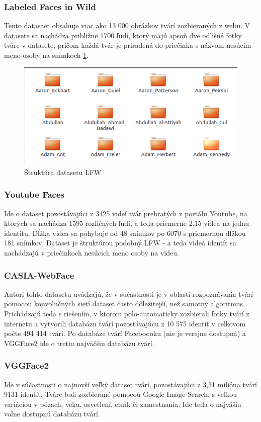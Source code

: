 \subsubsection{Labeled Faces in Wild}
Tento datasaet obsahuje viac ako 13 000 obrázkov tvárí zozbieraných z webu.
V datasete sa nachádza približne 1700 ľudí, ktorý majú apsoň dve odlišné fotky tváre v datasete,
pričom každá tvár je priradená do priečinka s názvom nesúcim meno osoby na snímkoch \ref{fig:lfwf}.\cite{LFWTech}

\begin{figure}[H]
	\centering
	\includegraphics[width=0.5\linewidth]{img/lfwf}
	\caption{Štruktúra datasetu LFW}
	\label{fig:lfwf}
\end{figure}

\subsubsection{Youtube Faces}
Ide o dataset pozostávajúci z 3425 videí tvár prebratých z portálu Youtube, na ktorých sa nachádza 1595 rozličných ľudí, a teda priemerne 2.15 videa na jednu identitu.
Dĺžka videa sa pohybuje od 48 snímkov po 6070 s priemernou dĺžkou 181 snímkov.
Dataset je štruktúrou podobný LFW - a teda videá identít sa nachádzajú v priečinkoch nesúcich meno osoby na videu.\cite{wolf2011face}

\subsubsection{CASIA-WebFace}
Autori tohto datasetu uvádzajú, že v súčastnosti je v oblasti rozpoznávania tvárí pomocou konvolučných sietí dataset často dôležitejší, než samotný algoritmus\cite{Centerfo}.
Prichádzajú teda s riešením, v ktorom polo-automaticky zozbierali fotky tvárí z internetu a vytvorili databázu tvárí pozostávajúcu z 10 575 identít v celkovom počte 494 414 tvárí.
Po databáze tvárí Faceboooku (nie je verejne dostupná) a VGGFace2 ide o tretiu najväčšiu databázu tvárí.
\subsubsection{VGGFace2}
Ide v súčastnosti o najnovší veľký dataset tvárí, pozostávajúci z 3,31 milióna tvárí 9131 identít.
Tváre boli zozbierané pomocou Google Image Search, s veľkou variáciou v pózach, veku, osvetlení, etník či zamestnania.\cite{cao2017vggface2}
Ide teda o najväšiu voľne dostupnú databázu tvárí.

